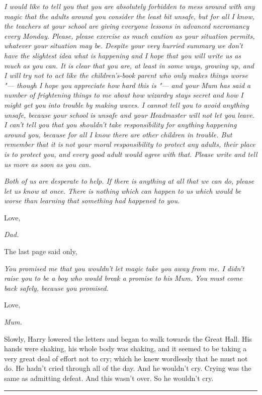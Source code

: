 \emph{I would like to tell you that you are absolutely forbidden to mess
around with any magic that the adults around you consider the least bit
unsafe, but for all I know, the teachers at your school are giving
everyone lessons in advanced necromancy every Monday. Please, please
exercise as much caution as your situation permits, whatever your
situation may be. Despite your very hurried summary we don't have the
slightest idea what is happening and I hope that you will write us as
much as you can. It is clear that you are, at least in some ways,
growing up, and I will} \emph{try} \emph{not to act like the
children's-book parent who only makes things worse "--- though I hope you
appreciate how hard this is "--- and your Mum has said a number of
frightening things to me about how wizardry stays secret and how I might
get} \emph{you} \emph{into trouble by making waves. I cannot tell you to
avoid anything unsafe, because your school is unsafe and your Headmaster
will not let you leave. I can't tell you that you shouldn't take
responsibility for anything happening around you, because for all I know
there are other children in trouble. But remember that it is} \emph{not}
\emph{your moral responsibility to protect any adults, their place is to
protect you, and every good adult would agree with that. Please write
and tell us more as soon as you can.}

\emph{Both of us are desperate to help. If there is anything at all that
we can do, please let us know at once. There is nothing which can happen
to us which would be worse than learning that something had happened to
you.}

Love,

\emph{Dad.}

The last page said only,

\emph{You promised me that you wouldn't let magic take you away from me.
I didn't raise you to be a boy who would break a promise to his Mum. You
must come back safely, because you promised.}

Love,

\emph{Mum.}

Slowly, Harry lowered the letters and began to walk towards the Great
Hall. His hands were shaking, his whole body was shaking, and it seemed
to be taking a very great deal of effort not to cry; which he knew
wordlessly that he must not do. He hadn't cried through all of the day.
And he wouldn't cry. Crying was the same as admitting defeat. And this
wasn't over. So he wouldn't cry.

\begin{center}\rule{3in}{0.4pt}\end{center}


